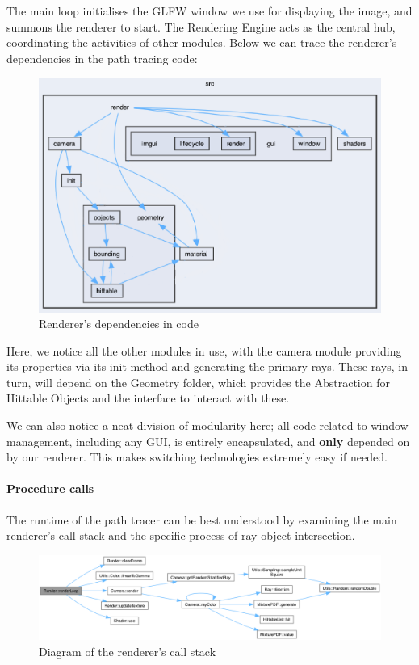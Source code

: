 \documentclass[12pt]{article}
\begin{document}
The main loop initialises the GLFW window we use for displaying the image, and summons the renderer to start.
The Rendering Engine acts as the central hub, coordinating the activities of other modules. Below we can trace the renderer's dependencies in the path tracing code:

\begin{figure}[H]
    \centering
    \includegraphics[width=\textwidth]{images/software_architecture/directory_dependencies.png}
    \caption{Renderer's dependencies in code}
    \label{fig:rendererdependency}
\end{figure}


Here, we notice all the other modules in use, with the camera module providing its properties via its init method and generating the primary rays. These rays, in turn, will depend on the Geometry folder, which provides the Abstraction for Hittable Objects and the interface to interact with these.

We can also notice a neat division of modularity here; all code related to window management, including any GUI, is entirely encapsulated, and \textbf{only} depended on by our renderer. This makes switching technologies extremely easy if needed.

\paragraph{Procedure calls}  The runtime of the path tracer can be best understood by examining the main renderer's call stack and the specific process of ray-object intersection.
\begin{figure}[H]
    \centering
    \includegraphics[width=\textwidth]{images/software_architecture/render_loop_call.png}
    \caption{Diagram of the renderer's call stack}
    \label{fig:renderercallstack}
\end{figure}
\end{document}

